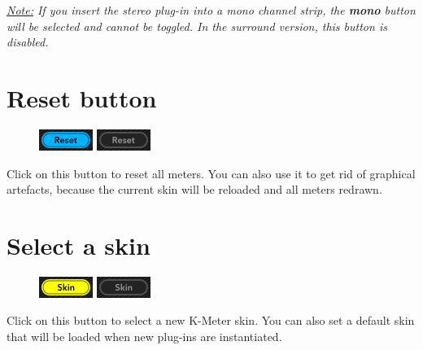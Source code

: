 \emph{\underline{Note:} If you insert the stereo plug-in into a mono
  channel strip, the \textbf{mono} button will be selected and cannot
  be toggled.  In the surround version, this button is disabled.}

\section{Reset button}

\begin{figure}
\includegraphics[scale=\screenshotscale,clip]{include/images/button_reset_on.png}
\newline \vspace{-0.9\baselineskip}
\includegraphics[scale=\screenshotscale,clip]{include/images/button_reset_off.png}
\end{figure}

Click on this button to reset all meters.  You can also use it to get
rid of graphical artefacts, because the current skin will be reloaded
and all meters redrawn.

\section{Select a skin}

\begin{figure}
\includegraphics[scale=\screenshotscale,clip]{include/images/button_skin_on.png}
\newline \vspace{-0.9\baselineskip}
\includegraphics[scale=\screenshotscale,clip]{include/images/button_skin_off.png}
\end{figure}

Click on this button to select a new K-Meter skin.  You can also set a
default skin that will be loaded when new plug-ins are instantiated.

\newpage %

